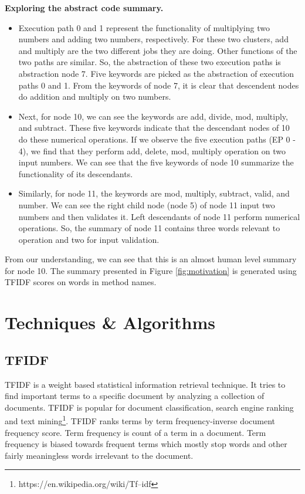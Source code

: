 \textbf{Exploring the abstract code summary.}
\begin{itemize}
    \item Execution path 0 and 1 represent the functionality of multiplying two numbers and adding two numbers, respectively. For these two clusters, add and multiply are the two different jobs they are doing. Other functions of the two paths are similar. So, the abstraction of these two execution paths is abstraction node 7. Five keywords are picked as the abstraction of execution paths 0 and 1. From the keywords of node 7, it is clear that descendent nodes do addition and multiply on two numbers.
    \item Next, for node 10, we can see the keywords are add, divide, mod, multiply, and subtract. These five keywords indicate that the descendant nodes of 10 do these numerical operations. If we observe the five execution paths (EP 0 - 4), we find that they perform add, delete, mod, multiply operation on two input numbers. We can see that the five keywords of node 10 summarize the functionality of its descendants.
    \item Similarly, for node 11, the keywords are mod, multiply, subtract, valid, and number. We can see the right child node (node 5) of node 11 input two numbers and then validates it. Left descendants of node 11 perform numerical operations. So, the summary of node 11 contains three words relevant to operation and two for input validation.
\end{itemize}
   From our understanding, we can see that this is an almost human level summary for node 10. The summary presented in Figure \ref{fig:motivation} is generated using TFIDF scores on words in method names. 

\section{ Techniques \& Algorithms}
\label{background:techniques}
\subsection{TFIDF}
TFIDF is a weight based statistical information retrieval technique. It tries to find important terms to a specific document by analyzing a collection of documents. TFIDF is popular for document classification, search engine ranking and text mining\footnote{https://en.wikipedia.org/wiki/Tf–idf}. TFIDF ranks terms by term frequency-inverse document frequency score. Term frequency is count of a term in a document. Term frequency is biased towards frequent terms which mostly stop words and other fairly meaningless words irrelevant to the document. 

